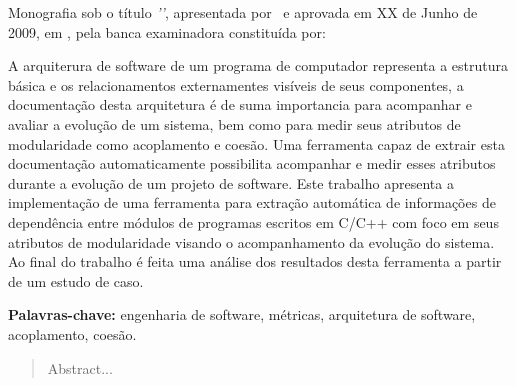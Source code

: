 

\capa
\folhaderosto

\begin{folhadeaprovacao}
 Monografia sob o título \textit{'\ABNTtitulodata'}, apresentada por
 \ABNTautordata\ e aprovada em XX de Junho de 2009, em \ABNTlocaldata, pela
 banca examinadora constituída por:
\end{folhadeaprovacao}

\begin{resumo}
A arquiterura de software de um programa de computador representa a estrutura
básica e os relacionamentos externamentes visíveis de seus componentes, a
documentação desta arquitetura é de suma importancia para acompanhar e avaliar
a evolução de um sistema, bem como para medir seus atributos de modularidade
como acoplamento e coesão. Uma ferramenta capaz de extrair esta documentação
automaticamente possibilita acompanhar e medir esses atributos durante a
evolução de um projeto de software. Este trabalho apresenta a implementação de
uma ferramenta para extração automática de informações de dependência entre
módulos de programas escritos em C/C++ com foco em seus atributos de
modularidade visando o acompanhamento da evolução do sistema. Ao final do
trabalho é feita uma análise dos resultados desta ferramenta a partir de um
estudo de caso.

{\bf Palavras-chave:} engenharia de software, métricas, arquitetura de
software, acoplamento, coesão.
\end{resumo}

\begin{abstract}
 Abstract...
\end{abstract}

\sumario
\listadefiguras
\listadetabelas
\listadesiglas

{}
\clearpage
\apendice


